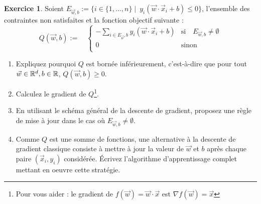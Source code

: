 \documentclass[a4paper,francais]{article}
\newcommand{\R}{{\ensuremath\mathbb{R}}}
\theoremstyle{definition}
\newtheorem{exercice}{Exercice}[section]
\begin{document}
\begin{exercice}
  Soient $E_{\vec{w},b} := \{i \in \{1,\dots,n\} \mid \ y_i (\vec{w}\cdot\vec{x}_i + b) \leq 0\}$,
  l'ensemble des contraintes non satisfaites et la fonction objectif suivante :
  \[
  Q(\vec{w},b) :=
  \quad
  \left\{
  \begin{array}{ll}
    - \sum_{i \in E_{\vec{w}},b} y_i (\vec{w}\cdot\vec{x}_i + b) & \text{si}\quad E_{\vec{w},b} \neq \emptyset \\
    0 & \text{sinon} \\
  \end{array}
  \right.
  \]

  \begin{enumerate}
  \item Expliquez pourquoi $Q$ est bornée inférieurement, c'est-à-dire que
    pour tout $\vec{w} \in \R^d, b \in \R$,  $Q(\vec{w},b) \geq 0$. 
  \item Calculez le gradient de $Q$\footnote{Pour vous aider :
  le gradient de $f(\vec{w}) = \vec{w}\cdot\vec{x}$ est $\nabla f(\vec{w}) = \vec{x}$}.
  \item En utilisant le schéma général de la descente de gradient,
    proposez une règle de mise à jour dans le cas où $E_{\vec{w},b} \neq \emptyset$. 
  \item Comme $Q$ est une somme de fonctions, une alternative à la descente de gradient classique
  consiste à mettre à jour la valeur de $\vec{w}$ et $b$ après chaque paire $(\vec{x}_i, y_i)$
  considérée. \'Ecrivez l'algorithme d'apprentissage complet mettant en oeuvre cette stratégie. 
  \end{enumerate}
\end{exercice}
\end{document}
